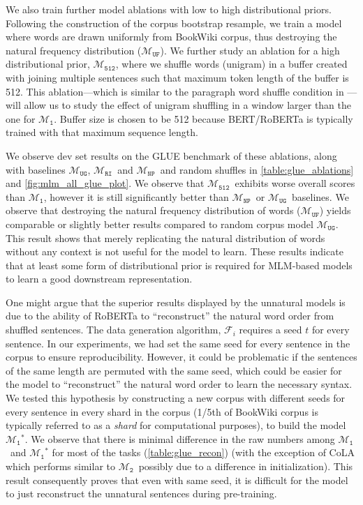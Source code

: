 \documentclass[letterpaper, 12pt]{report}
\newcommand{\RI}{$\mathcal{M}_{\texttt{1}}$}
\newcommand{\RII}{$\mathcal{M}_{\texttt{2}}$}
\newcommand{\RC}{$\mathcal{M}_{\texttt{UG}}$}
\newcommand{\RU}{$\mathcal{M}_{\texttt{UF}}$}
\newcommand{\RT}{$\mathcal{M}_{\texttt{RI}}$}
\newcommand{\NP}{$\mathcal{M}_{\texttt{NP}}$}
\newcommand{\RV}{$\mathcal{M}_{\texttt{512}}$}
\begin{document}
We also train further model ablations with low to high distributional priors. Following the construction of the corpus bootstrap resample, we train a model where words are drawn uniformly from BookWiki corpus, thus destroying the natural frequency distribution (\RU). We further study an ablation for a high distributional prior, \RV, where we shuffle words (unigram) in a buffer created with joining multiple sentences such that maximum token length of the buffer is 512. This ablation---which is similar to the paragraph word shuffle condition in \cite{gauthier-levy-2019-linking}---will allow us to study the effect of unigram shuffling in a window larger than the one for \RI. Buffer size is chosen to be 512 because BERT/RoBERTa is typically trained with that maximum sequence length.

We observe dev set results on the GLUE benchmark of these ablations, along with baselines \RC, \RT\ and \NP\ and random shuffles in \autoref{table:glue_ablations} and \autoref{fig:mlm_all_glue_plot}. We observe that \RV\ exhibits worse overall scores than \RI, however it is still significantly better than \NP\ or \RC\ baselines. We observe that destroying the natural frequency distribution of words (\RU) yields comparable or slightly better results compared to random corpus model \RC. This result shows that merely replicating the natural distribution of words without any context is not useful for the model to learn. These results indicate that at least some form of distributional prior is required for MLM-based models to learn a good downstream representation.



One might argue that the superior results displayed by the unnatural models is due to the ability of RoBERTa to ``reconstruct'' the natural word order from shuffled sentences. The data generation algorithm, $\mathcal{F}_{i}$ requires a seed $t$ for every sentence. In our experiments, we had set the same seed for every sentence in the corpus to ensure reproducibility. However, it could be problematic if the sentences of the same length are permuted with the same seed, which could be easier for the model to ``reconstruct'' the natural word order to learn the necessary syntax. We tested this hypothesis by constructing a new corpus with different seeds for every sentence in every shard in the corpus (1/5th of BookWiki corpus is typically referred to as a \textit{shard} for computational purposes), to build the model \RI$^{*}$. We observe that there is minimal difference in the raw numbers among \RI\ and \RI$^{*}$ for most of the tasks (\autoref{table:glue_recon}) (with the exception of CoLA which performs similar to \RII\, possibly due to a difference in initialization). This result consequently proves that even with same seed, it is difficult for the model to just reconstruct the unnatural sentences during pre-training.
\end{document}
